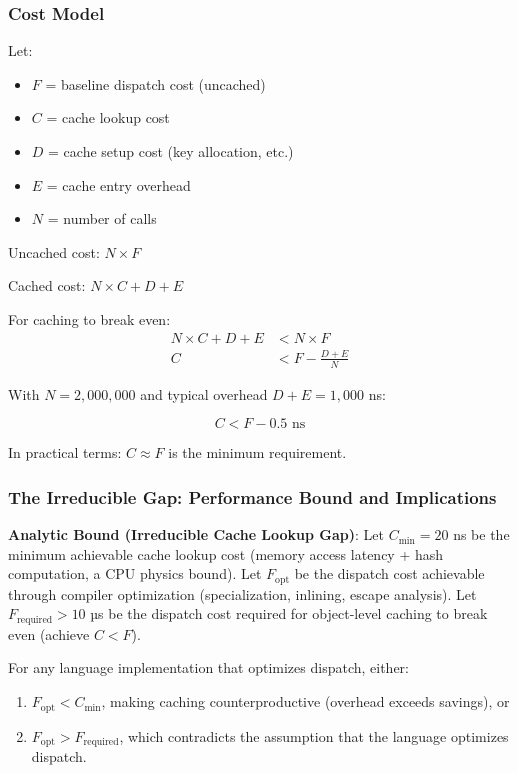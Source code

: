 \documentclass[sigplan,final,acmsmall,review,screen]{acmart}
\begin{document}
\subsubsection{Cost Model}

Let:
\begin{itemize}
  \item $F$ = baseline dispatch cost (uncached)
  \item $C$ = cache lookup cost
  \item $D$ = cache setup cost (key allocation, etc.)
  \item $E$ = cache entry overhead
  \item $N$ = number of calls
\end{itemize}

Uncached cost: $N \times F$

Cached cost: $N \times C + D + E$

For caching to break even:
\begin{align}
N \times C + D + E &< N \times F \\
C &< F - \frac{D + E}{N}
\end{align}

With $N = 2,000,000$ and typical overhead $D + E = 1,000$ ns:

\begin{equation}
C < F - 0.5 \text{ ns}
\end{equation}

In practical terms: $C \approx F$ is the minimum requirement.

\subsubsection{The Irreducible Gap: Performance Bound and Implications}

\textbf{Analytic Bound (Irreducible Cache Lookup Gap)}:
Let $C_{\text{min}} = 20$ ns be the minimum achievable cache lookup cost (memory access latency + hash computation, a CPU physics bound).
Let $F_{\text{opt}}$ be the dispatch cost achievable through compiler optimization (specialization, inlining, escape analysis).
Let $F_{\text{required}} > 10$ µs be the dispatch cost required for object-level caching to break even (achieve $C < F$).

For any language implementation that optimizes dispatch, either:
\begin{enumerate}
  \item $F_{\text{opt}} < C_{\text{min}}$, making caching counterproductive (overhead exceeds savings), or
  \item $F_{\text{opt}} > F_{\text{required}}$, which contradicts the assumption that the language optimizes dispatch.
\end{enumerate}
\end{document}
